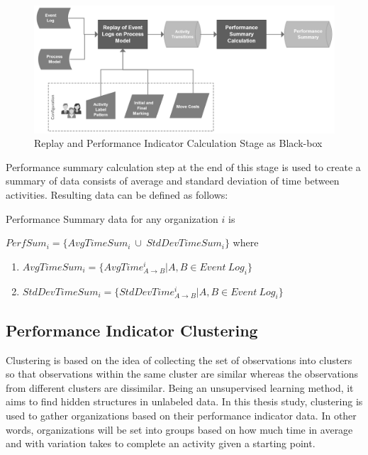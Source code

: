 \begin{figure}
  \centering
  \includegraphics[width=\textwidth]{4_methodology/replay-and-performance-indicator-calculation}
  \caption{Replay and Performance Indicator Calculation Stage as Black-box}
  \label{fig:replay-and-performance-indicator-calculation}
\end{figure}

Performance summary calculation step at the end of this stage is used to create a summary of data consists of average and standard deviation of time between activities. Resulting data can be defined as follows:
	\theoremstyle{definition}
	\begin{definition}{} Performance Summary data for any organization $i$ is 

	$PerfSum_{i}= \{AvgTimeSum_{i}\ \cup\ StdDevTimeSum_{i}\}$ where
		\begin{enumerate}
			\item $AvgTimeSum_{i} = \{ AvgTime_{A \rightarrow B}^{i} | A , B  \in Event\ Log_{i}\}$
			\item $StdDevTimeSum_{i} = \{ StdDevTime_{ A\rightarrow B}^{i} | A, B  \in Event\ Log_{i}\}$
		\end{enumerate}
	\end{definition}

\subsection{Performance Indicator Clustering}
\label{subsec:performance-indicator-clustering}

Clustering is based on the idea of collecting the set of observations into clusters so that observations within the same cluster are similar whereas the observations from different clusters are dissimilar. Being an unsupervised learning method, it aims to find hidden structures in unlabeled data. In this thesis study, clustering is used to gather organizations based on their performance indicator data. In other words, organizations will be set into groups based on how much time in average and with variation takes to complete an activity given a starting point.

